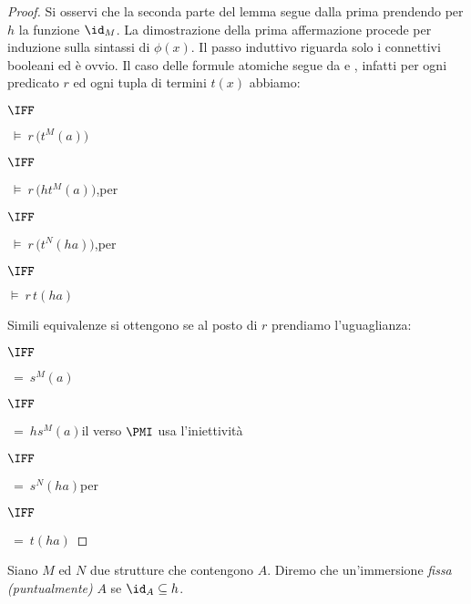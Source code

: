 \begin{proof}
Si osservi che la seconda parte del lemma segue dalla prima prendendo per $h$ la funzione $\id_M$. La dimostrazione della prima affermazione procede per induzione sulla sintassi di $\phi(x)$. Il passo induttivo riguarda solo i connettivi booleani ed \`e ovvio. Il caso delle formule atomiche segue da  e , infatti per ogni predicato $r$ ed ogni tupla di termini $t(x)$ abbiamo:

\hspace*{19ex}\parbox{7ex}{\hfil$\IFF$}\hspace{3ex}$\ \models\  r\,\big(t^M(a)\big)$

\hspace*{19ex}\parbox{7ex}{\hfil$\IFF$}\hspace{3ex}$\ \models\  r\,\big(ht^M(a)\big)$,\hfill per 

\hspace*{19ex}\parbox{7ex}{\hfil$\IFF$}\hspace{3ex}$\ \models\  r\,\big(t^N(ha)\big)$,\hfill per 

\hspace*{19ex}\parbox{7ex}{\hfil$\IFF$}\hspace{3ex}$\models\ r\,t(ha)$

Simili equivalenze si ottengono se al posto di $r$ prendiamo l'uguaglianza: 

\hspace*{19ex}\parbox{9ex}{\hfil$\IFF$}\hspace{8ex}$\ =\ s^M(a)$

\hspace*{19ex}\parbox{9ex}{\hfil$\IFF$}\hspace{8ex}$\ =\ hs^M(a)$\hfill il verso $\PMI$  usa l'iniettivit\`a

\hspace*{19ex}\parbox{9ex}{\hfil$\IFF$}\hspace{8ex}$\ =\ s^N(ha)$\hfill per 

\hspace*{19ex}\parbox{9ex}{\hfil$\IFF$}\hspace{8ex}$\ =\ t(ha)$
\end{proof}

Siano $M$ ed $N$ due strutture che contengono $A$. Diremo che un'immersione \emph{fissa (puntualmente)\/} $A$ se $\id_A\subseteq h$.

